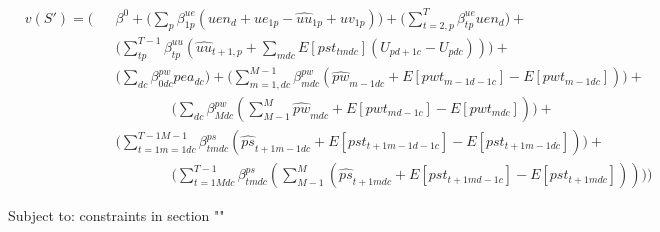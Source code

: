 \documentclass{article}
\begin{document}
\begin{equation}\begin{alignedat}{10}
	&	v(S') = \Bigg( 
		&& 	\beta^0 + 
			\bigg( \sum_{p} \beta_{1p}^{ue} 
				(uen_{d} + ue_{1p} - \hat{uu}_{1p} + uv_{1p}) \bigg)+
			\bigg( \sum_{t=2,p}^{T} \beta_{tp}^{ue} uen_{d} \bigg)+ \\
	&	&& 	\bigg( \sum_{tp}^{T-1} \beta_{tp}^{uu} 
				( \hat{uu}_{t+1,p} + \sum_{mdc} E[pst_{tmdc}] (U_{pd+1c} - U_{pdc})) \bigg) + \\
	&	&&	\bigg( \sum_{dc} \beta_{0dc}^{pw} pea_{dc} \bigg) +
			\bigg( \sum_{m=1,dc}^{M-1} \beta_{mdc}^{pw} 
				(\hat{pw}_{m-1dc} + E[pwt_{m-1d-1c}] - E[pwt_{m-1dc}]) \bigg) + \\
	&	&&	\qquad \qquad \bigg( \sum_{dc} \beta_{Mdc}^{pw} 
				(\sum_{M-1}^{M} \hat{pw}_{mdc} + E[pwt_{md-1c}] - E[pwt_{mdc}])\bigg) + \\
	& 	&&	\bigg( \sum_{t=1m=1dc}^{T-1M-1} \beta_{tmdc}^{ps} 
				(\hat{ps}_{t+1m-1dc} + E[pst_{t+1m-1d-1c}] - E[pst_{t+1m-1dc}]) \bigg) + \\	
	&	&&	\qquad \qquad \bigg( \sum_{t=1Mdc}^{T-1} \beta_{tmdc}^{ps} 
				(\sum_{M-1}^{M} (\hat{ps}_{t+1mdc} + E[pst_{t+1md-1c}] - E[pst_{t+1mdc}])) \bigg)
			\Bigg)
\end{alignedat}
\end{equation}

Subject to:
constraints in section ""
\end{document}
